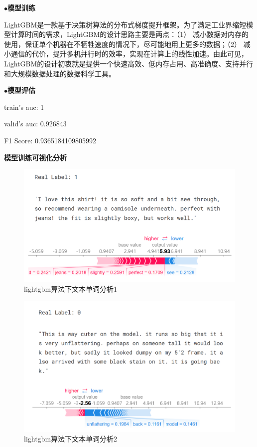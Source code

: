 \documentclass[
  journal=medium,
  manuscript=article-type,
  year=2023,
  volume=37,
]{cup-journal}
\begin{document}
\noindent$\bullet$\textbf{模型训练}

LightGBM是一款基于决策树算法的分布式梯度提升框架。为了满足工业界缩短模型计算时间的需求，LightGBM的设计思路主要是两点：（1）   减小数据对内存的使用，保证单个机器在不牺牲速度的情况下，尽可能地用上更多的数据；（2）   减小通信的代价，提升多机并行时的效率，实现在计算上的线性加速。由此可见，LightGBM的设计初衷就是提供一个快速高效、低内存占用、高准确度、支持并行和大规模数据处理的数据科学工具。

\noindent$\bullet$\textbf{模型评估}

train's auc: 1

valid's auc: 0.926843

F1 Score: 0.9365184109805992

\noindent \textbf{模型训练可视化分析}

\begin{figure}[hbt!]
    \centering
    \includegraphics[width=1\linewidth]{text2.png}
    \caption{lightgbm算法下文本单词分析1}
    \label{text2}
\end{figure}

\begin{figure}[t]
    \centering
    \includegraphics[width=1\linewidth]{text3.png}
    \caption{lightgbm算法下文本单词分析2}
    \label{text3}
\end{figure}
\end{document}
